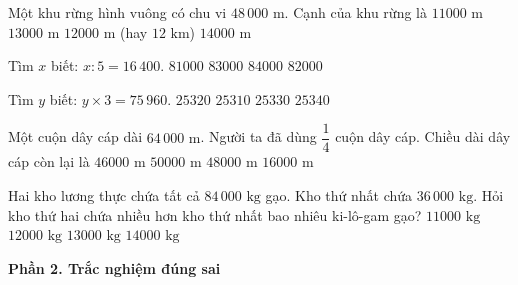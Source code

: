 \begin{ex} %
Một khu rừng hình vuông có chu vi $48\,000\text{ m}$. Cạnh của khu rừng là
\choice
{$11000\text{ m}$}
{$13000\text{ m}$}
{\True $12000\text{ m}$ (hay $12\text{ km}$)}
{$14000\text{ m}$}
\end{ex}

\begin{ex} %
Tìm $x$ biết: $x : 5 = 16\,400$.
\choice
{$81000$}
{$83000$}
{$84000$}
{\True $82000$}
\end{ex}

\begin{ex} %
Tìm $y$ biết: $y \times 3 = 75\,960$.
\choice
{\True $25320$}
{$25310$}
{$25330$}
{$25340$}
\end{ex}

\begin{ex} %
Một cuộn dây cáp dài $64\,000\text{ m}$. Người ta đã dùng $\dfrac{1}{4}$ cuộn dây cáp. Chiều dài dây cáp còn lại là
\choice
{$46000\text{ m}$}
{$50000\text{ m}$}
{\True $48000\text{ m}$}
{$16000\text{ m}$}
\end{ex}

\begin{ex} %
Hai kho lương thực chứa tất cả $84\,000\text{ kg}$ gạo. Kho thứ nhất chứa $36\,000\text{ kg}$. Hỏi kho thứ hai chứa nhiều hơn kho thứ nhất bao nhiêu ki-lô-gam gạo?
\choice
{$11000\text{ kg}$}
{\True $12000\text{ kg}$}
{$13000\text{ kg}$}
{$14000\text{ kg}$}
\end{ex}

\textbf{Phần 2. Trắc nghiệm đúng sai}

